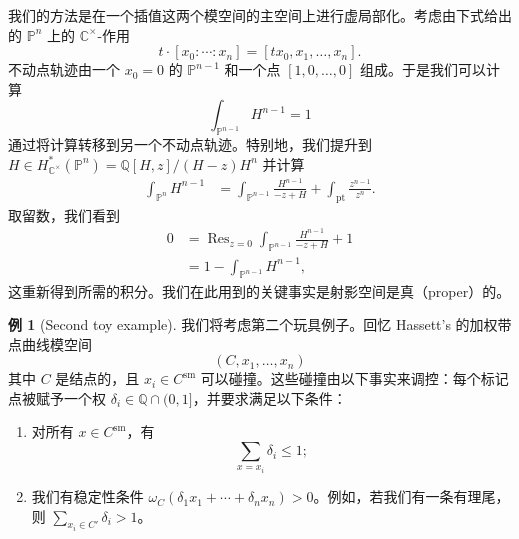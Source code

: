 \documentclass{amsart}
\theoremstyle{definition}
\newtheorem{exm}[thm]{例}
\theoremstyle{remark}
\theoremstyle{plain}
\theoremstyle{definition}
\theoremstyle{remark}
\newcommand{\C}{\mathbb{C}}
\newcommand{\Q}{\mathbb{Q}}
\renewcommand{\P}{\mathbb{P}}
\newcommand{\mr}[1]{\mathrm{#1}}
\newcommand{\on}[1]{\operatorname{#1}}
\newcommand{\1}{\mathbf{1}}
\newcommand{\2}{\mathbf{2}}
\newcommand{\3}{\mathbf{3}}
\begin{document}
我们的方法是在一个插值这两个模空间的主空间上进行虚局部化。考虑由下式给出的 \(\P^n\) 上的 \(\C^{\times}\)-作用
\[ t \cdot [x_0 : \cdots : x_n] = [t x_0, x_1, \ldots, x_n]. \]
不动点轨迹由一个 \(x_0 = 0\) 的 \(\P^{n-1}\) 和一个点 \([1, 0, \ldots, 0]\) 组成。于是我们可以计算
\[ \int_{\P^{n-1}} H^{n-1} = 1 \]
通过将计算转移到另一个不动点轨迹。特别地，我们提升到 \(H \in H_{\C^{\times}}^* (\P^n) = \Q[H,z] / (H-z)H^n\) 并计算
\begin{align*}
    \int_{\P^n} H^{n-1} &= \int_{\P^{n-1}} \frac{H^{n-1}}{-z+H} + \int_{\mr{pt}} \frac{z^{n-1}}{z^n}.
\end{align*}
取留数，我们看到
\begin{align*}
    0 &= \on{Res}_{z = 0}\int_{\P^{n-1}} \frac{H^{n-1}}{-z+H} + 1 \\
    &= 1 - \int_{\P^{n-1}}H^{n-1},
\end{align*}
这重新得到所需的积分。我们在此用到的关键事实是射影空间是真（proper）的。

\begin{exm}[Second toy example]
    我们将考虑第二个玩具例子。回忆 Hassett's 的加权带点曲线模空间
    \[ (C, x_1, \ldots, x_n) \]
    其中 \(C\) 是结点的，且 \(x_i \in C^{\mr{sm}}\) 可以碰撞。这些碰撞由以下事实来调控：每个标记点被赋予一个权 \(\delta_i \in \Q \cap (0,1]\)，并要求满足以下条件：
    \begin{enumerate}
        \item 对所有 \(x \in C^{\mr{sm}}\)，有
            \[ \sum_{x = x_i} \delta_i \leq 1; \]
        \item 我们有稳定性条件 \(\omega_C(\delta_1 x_1 + \cdots + \delta_n x_n) > 0\)。例如，若我们有一条有理尾，则 \(\sum_{x_i \in C'} \delta_i > 1\)。
    \end{enumerate}
\end{exm}
\end{document}
